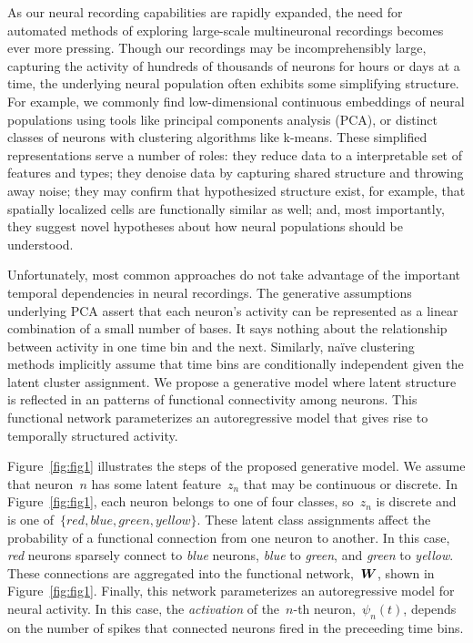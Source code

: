 As our neural recording capabilities are rapidly expanded, the need for automated methods of exploring large-scale multineuronal recordings becomes ever more pressing. 
Though our recordings may be incomprehensibly large, capturing the activity of hundreds of thousands of neurons for hours or days at a time, the underlying neural population often exhibits some simplifying structure. 
For example, we commonly find low-dimensional continuous embeddings of neural populations using tools like principal components analysis (PCA), or distinct classes of neurons with clustering algorithms like k-means. 
These simplified representations serve a number of roles: 
they reduce data to a interpretable set of features and types; 
they denoise data by capturing shared structure and throwing away noise; 
they may confirm that hypothesized structure exist, for example, that spatially localized cells are functionally similar as well; 
and, most importantly, they suggest novel hypotheses about how neural populations should be understood.


Unfortunately, most common approaches do not take advantage of the important temporal dependencies in neural recordings. 
The generative assumptions underlying PCA assert that each neuron's activity can be represented as a linear combination of a small number of bases. 
It says nothing about the relationship between activity in one time bin and the next.
Similarly, na\"ive clustering methods implicitly assume that time bins are conditionally independent given the latent cluster assignment. 
We propose a generative model where latent structure is reflected in an patterns of functional connectivity among neurons.  This functional network parameterizes an autoregressive model that gives rise to temporally structured activity.
  
Figure~\ref{fig:fig1} illustrates the steps of the proposed generative model. 
We assume that neuron~$n$ has some latent feature~$z_n$ that may be continuous or discrete. 
In Figure~\ref{fig:fig1}, each neuron belongs to one of four classes, so~$z_n$ is discrete and is one of~$\{\textit{red}, \textit{blue}, \textit{green}, \textit{yellow}\}$. 
These latent class assignments affect the probability of a functional connection from one neuron to another. 
In this case, \textit{red} neurons sparsely connect to \textit{blue} neurons, \textit{blue} to \textit{green}, and \textit{green} to \textit{yellow}.
These connections are aggregated into the functional network,~$\boldsymbol{W}$, shown in Figure~\ref{fig:fig1}.
Finally, this network parameterizes an autoregressive model for neural activity.
In this case, the \textit{activation} of the~$n$-th neuron,~$\psi_n(t)$, depends on the number of spikes that connected neurons fired in the preceeding time bins. 

